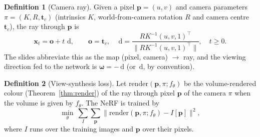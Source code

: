 \documentclass[11pt,a4paper]{article}
\newcommand{\dd}{\,\mathrm{d}}
\newcommand{\om}{\boldsymbol{\omega}}
\newcommand{\xx}{\boldsymbol{x}}
\theoremstyle{definition}
\newtheorem{definition}{Definition}[section]
\theoremstyle{plain}
\theoremstyle{remark}
\begin{document}
\begin{definition}[Camera ray]
Given a pixel $\boldsymbol p=(u,v)$ and camera parameters $\pi=(K,R,\boldsymbol t_c)$ (intrinsics $K$, world-from-camera rotation $R$ and camera centre $\boldsymbol t_c$), the ray through $\boldsymbol p$ is
\[
\xx_t=\boldsymbol o+t\,\dd,\qquad \boldsymbol o=\boldsymbol t_c,\quad \dd=\frac{RK^{-1}(u,v,1)^\top}{\|RK^{-1}(u,v,1)^\top\|},\quad t\ge0 .
\]
The slides abbreviate this as the map (pixel, camera) $\to$ ray, and the viewing direction fed to the network is $\om=-\dd$ (or $\dd$, by convention).
\end{definition}

\begin{definition}[View-synthesis loss]
Let $\mathrm{render}(\boldsymbol p,\pi;f_\theta)$ be the volume-rendered colour (Theorem~\ref{thm:render}) of the ray through pixel $\boldsymbol p$ of the camera $\pi$ when the volume is given by $f_\theta$. The NeRF is trained by
\[
\min_\theta\ \sum_{I}\sum_{\boldsymbol p}\big\|\mathrm{render}(\boldsymbol p,\pi;f_\theta)-I[\boldsymbol p]\big\|^2 ,
\]
where $I$ runs over the training images and $\boldsymbol p$ over their pixels.
\end{definition}
\end{document}
